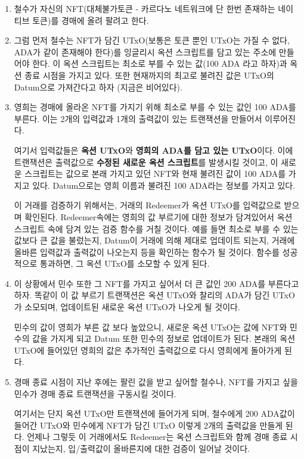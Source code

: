 \documentclass[a4paper, 11pt]{article}
\begin{document}
    \begin{enumerate}
        \item 철수가 자신의 NFT(대체불가토큰 - 카르다노 네트워크에 단 한번 존재하는 네이티브 토큰)를 경매에 올려 팔려고 한다.
        \item 그럼 먼저 철수는 NFT가 담긴 UTxO(보통은 토큰 뿐인 UTxO는 가질 수 없다, ADA가 같이 존재해야 한다)를 잉글리시 옥션 스크립트를 담고 있는 주소에 만들어야 한다. 이 옥션 스크립트는 최소로 부를 수 있는 값(100 ADA 라고 하자)과 옥션 종료 시점을 가지고 있다. 또한 현재까지의 최고로 불려진 값은 UTxO의 Datum으로 가져간다고 하자 (지금은 비어있다).
        \item 영희는 경매에 올라온 NFT를 가지기 위해 최소로 부를 수 있는 값인 100 ADA를 부른다. 이는 2개의 입력값과 1개의 출력값이 있는 트랜잭션을 만들어서 이루어진다.
        
        여기서 입력값들은 \textbf{옥션 UTxO}와 \textbf{영희의 ADA를 담고 있는 UTxO}이다. 이에 트랜잭션은 출력값으로 \textbf{수정된 새로운 옥션 스크립트}를 발생시킬 것이고, 이 새로운 스크립트는 값으로 본래 가지고 있던 NFT와 현재 불려진 값이 100 ADA를 가지고 있다. Datum으로는 영희 이름과 불려진 100 ADA라는 정보를 가지고 있다.

        이 거래를 검증하기 위해서는, 거래의 Redeemer가 옥션 UTxO를 입력값으로 받으며 확인된다. Redeemer속에는 영희의 값 부르기에 대한 정보가 담겨있어서 옥션 스크립트 속에 담겨 있는 검증 함수를 거칠 것이다. 예를 들면 최소로 부를 수 있는 값보다 큰 값을 불렀는지, Datum이 거래에 의해 제대로 업데이트 되는지, 거래에 올바른 입력값과 출력값이 나오는지 등을 확인하는 함수가 될 것이다. 함수를 성공적으로 통과하면, 그 옥션 UTxO를 소모할 수 있게 된다.
        \item 이 상황에서 민수 또한 그 NFT를 가지고 싶어서 더 큰 값인 200 ADA를 부른다고 하자. 똑같이 이 값 부르기 트랜잭션은 옥션 UTxO와 찰리의 ADA가 담긴 UTxO가 소모되며, 업데이트된 새로운 옥션 UTxO가 나오게 될 것이다.
        
        민수의 값이 영희가 부른 값 보다 높았으니, 새로운 옥션 UTxO는 값에 NFT와 민수의 값을 가지게 되고 Datum 또한 민수의 정보로 업데이트가 된다. 본래의 옥션 UTxO에 들어있던 영희의 값은 추가적인 출력값으로 다시 영희에게 돌아가게 된다.
        \item 경매 종료 시점이 지난 후에는 팔린 값을 받고 싶어할 철수나, NFT를 가지고 싶을 민수가 경매 종료 트랜잭션을 구동시킬 것이다. 
        
        여기서는 단지 옥션 UTxO만 트랜잭션에 들어가게 되며, 철수에게 200 ADA값이 들어간 UTxO와 민수에게 NFT가 담긴 UTxO 이렇게 2개의 출력값을 만들게 된다. 언제나 그렇듯 이 거래에서도 Redeemer는 옥션 스크립트와 함께 경매 종료 시점이 지났는지, 입/출력값이 올바른지에 대한 검증이 일어날 것이다.


\end{enumerate}
\end{document}
